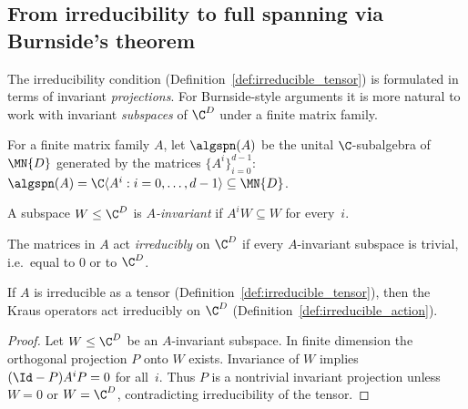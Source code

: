 \subsection{From irreducibility to full spanning via Burnside's theorem}
\label{subsec:burnside_full_span}

The irreducibility condition (Definition~\ref{def:irreducible_tensor}) is formulated
in terms of invariant \emph{projections}.
For Burnside-style arguments it is more natural to work with invariant
\emph{subspaces} of $\C^D$ under a finite matrix family.

\begin{definition}\label{def:alg_span}
    \leanok
    For a finite matrix family $A$, let $\algspn(A)$ be the unital
    $\C$-subalgebra of $\MN{D}$ generated by the matrices
    $\{A^i\}_{i=0}^{d-1}$:
    $\algspn(A)=\C\langle A^i:i=0,\ldots,d-1\rangle\subseteq\MN{D}$.
\end{definition}

\begin{definition}\label{def:invariant_submodule}
    \leanok
    A subspace $W\le\C^D$ is \emph{$A$-invariant} if
    $A^iW\subseteq W$ for every~$i$.
\end{definition}

\begin{definition}\label{def:irreducible_action}
    \leanok
    The matrices in $A$ act \emph{irreducibly} on $\C^D$ if every
    $A$-invariant subspace is trivial, i.e.\ equal to $0$ or to $\C^D$.
\end{definition}

\begin{lemma}\label{thm:irreducible_tensor_to_action}
    \leanok
    If $A$ is irreducible as a tensor (Definition~\ref{def:irreducible_tensor}),
    then the Kraus operators act irreducibly on $\C^D$
    (Definition~\ref{def:irreducible_action}).
\end{lemma}

\begin{proof}\leanok
    Let $W\le\C^D$ be an $A$-invariant subspace.
    In finite dimension the orthogonal projection $P$ onto $W$ exists.
    Invariance of $W$ implies $(\Id-P)A^iP=0$ for all~$i$.
    Thus $P$ is a nontrivial invariant projection unless $W=0$ or
    $W=\C^D$, contradicting irreducibility of the tensor.
\end{proof}

